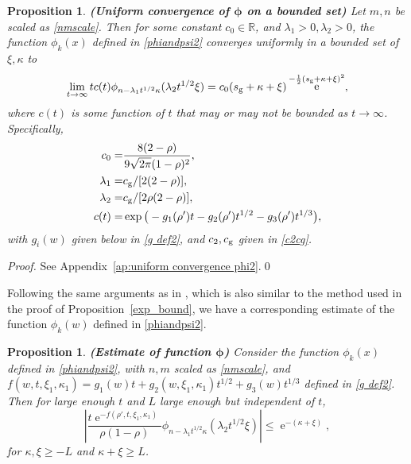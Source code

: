 \documentclass[cmp]{svjour}
\numberwithin{theorem}{section}
\numberwithin{equation}{section}
\DeclareMathOperator{\e}{e}
\newtheorem{prop}[theorem]{Proposition}
\begin{document}
\begin{prop}
\label{uniform convergence phi2}
{\rm \textbf{(Uniform convergence of $\boldsymbol{\phi}$ on a bounded set)}}
Let $m,n$ be scaled as \eqref{nmscale}. Then for some constant $c_0\in\mathbb{R}$, and $\lambda_1>0,\lambda_2>0$, the function $\phi_k(x)$ defined in \eqref{phiandpsi2} converges uniformly in a bounded set of $\xi,\kappa$ to
\begin{equation*}
\label{phi2 limit}
\lim_{t \rightarrow \infty}
tc(t)
\phi_{n-\lambda_1 t^{1/2}\kappa}(\lambda_2 t^{1/2}\xi)
=c_0
(s_{\rm g}+\kappa+\xi)\e^{- \frac{1}{2} (s_{\rm g}+\kappa+\xi)^2},
\end{equation*}
where $c(t)$ is some function of $t$ that may or may not be bounded as $t\rightarrow\infty$. Specifically,
\begin{equation}\label{ConstantsGaussian}
\begin{split}
c_0=&\frac{8(2-\rho)}{9\sqrt{2\pi}(1-\rho)^2},\\
\lambda_1=&c_{\rm g}/[2(2-\rho)],
\\
\lambda_2=&c_{\rm g}/[2 \rho(2-\rho)],
\\
c(t)=&\exp\big(-
g_1(\rho')t - g_2(\rho')t^{1/2} - g_3(\rho')t^{1/3}\big),
\end{split}
\end{equation}
with $g_i(w)$ given below in \eqref{g def2}, and $c_2,c_{\rm g}$ given in \eqref{c2cg}.
\end{prop}


\begin{proof}
See Appendix~\ref{ap:uniform convergence phi2}.\qed
\end{proof}
Following the same arguments as in \cite{borodin2008transition,borodin2007fluctuationsintasep,BFPS2007}, which is also similar to the method used in the proof of Proposition~\ref{exp_bound}, we have a corresponding estimate of the function $\phi_k(w)$ defined in \eqref{phiandpsi2}.


\medskip
\begin{prop}
\label{bound phi2}
{\rm \textbf{(Estimate of function $\boldsymbol{\phi}$)} }
Consider the function $\phi_k(x)$ defined in \eqref{phiandpsi2}, with $n,m$ scaled as \eqref{nmscale}, and $f(w,t, \xi_1, \kappa_1)=g_1(w)t+g_2(w,\xi_1,\kappa_1)t^{1/2}+g_3(w)t^{1/3}$ defined in \eqref{g def2}. Then for large enough $t$ and $L$ large enough but independent of $t$,
\begin{equation*}
  \left|
\frac{t \e^{-f(\rho',t ,\xi_1, \kappa_1 )}}{\rho(1-\rho)}\phi_{n-\lambda_1 t^{1/2}\kappa}(\lambda_2 t^{1/2}\xi)
\right|
\leq \e^{-(\kappa+\xi)},
\end{equation*}
for $\kappa,\xi\geq -L$ and $\kappa+\xi \geq L$.
\end{prop}
\end{document}
